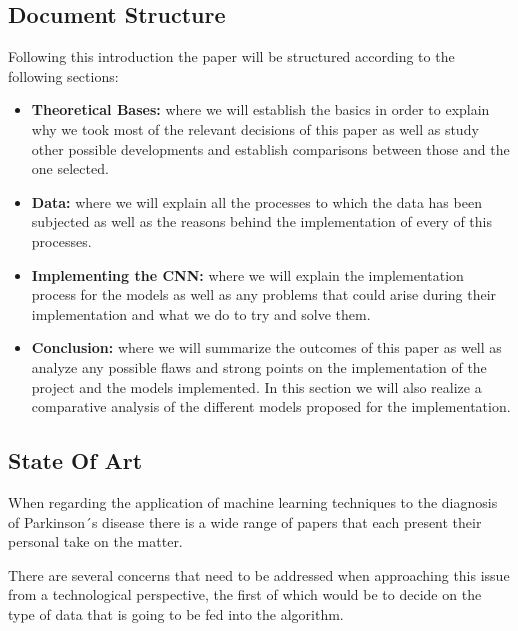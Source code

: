 \documentclass[12pt, a4paper]{article}
\begin{document}
	
	\clearpage
	
	\subsection{Document Structure}
	
	Following this introduction the paper will be structured according to the following sections:
	
	\begin{itemize}
		
		
		\item \textbf{Theoretical Bases:} where we will establish the basics in order to explain why we took most of the relevant decisions of this paper as well as study other possible developments and establish comparisons between those and the one selected.
		
		\item \textbf{Data:} where we will explain all the processes to which the data has been subjected as well as the reasons behind the implementation of every of this processes.
		
		\item \textbf{Implementing the CNN:} where we will explain the implementation process for the models as well as any problems that could arise during their implementation and what we do to try and solve them.
		
		\item \textbf{Conclusion:} where we will summarize the outcomes of this paper as well as analyze any possible flaws and strong points on the implementation of the project and the models implemented. In this section we will also realize a comparative analysis of the different models proposed for the implementation.
		
		
	\end{itemize}

	\clearpage
	
	\subsection{State Of Art}
	
	When regarding the application of machine learning techniques to the diagnosis of Parkinson´s disease there is a wide range of papers that each present their personal take on the matter.
	
	There are several concerns that need to be addressed when approaching this issue from a technological perspective, the first of which would be to decide on the type of data that is going to be fed into the algorithm.
	
\end{document}
